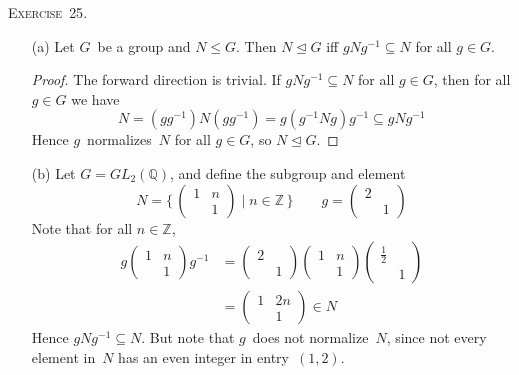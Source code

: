 \documentclass[letterpaper]{article}
\newcommand{\exercise}[1]{\goodbreak\noindent\textsc{Exercise~{#1}.}}
\newcommand{\Z}{\mathbb{Z}}
\newcommand{\Q}{\mathbb{Q}}
\newcommand{\subgroup}{\le}
\newcommand{\normal}{\trianglelefteq}
\begin{document}
\exercise{25}
\begin{enumerate}[itemsep=0pt]
\item[(a)] Let $G$~be a group and $N\subgroup G$. Then $N\normal G$ iff $gNg^{-1}\subseteq N$ for all $g\in G$.
\begin{proof}
The forward direction is trivial. If $gNg^{-1}\subseteq N$ for all $g\in G$, then for all $g\in G$ we have
$$N=(gg^{-1})N(gg^{-1})=g(g^{-1}Ng)g^{-1}\subseteq gNg^{-1}$$
Hence $g$~normalizes~$N$ for all $g\in G$, so $N\normal G$.
\end{proof}
\item[(b)] Let $G=GL_2(\Q)$, and define the subgroup and element
$$N=\biggl\{\,
\begin{pmatrix}
1&n\\
 &1
\end{pmatrix}
\mid n\in\Z\,\biggr\}\qquad g=\begin{pmatrix}2&\\&1\end{pmatrix}$$
Note that for all $n\in\Z$,
\begin{align*}
g\begin{pmatrix}1&n\\&1\end{pmatrix}g^{-1}
&=\begin{pmatrix}2&\\&1\end{pmatrix}\begin{pmatrix}1&n\\&1\end{pmatrix}\begin{pmatrix}\tfrac{1}{2}&\\&1\end{pmatrix}\\
&=\begin{pmatrix}1&2n\\&1\end{pmatrix}\in N
\end{align*}
Hence $gNg^{-1}\subseteq N$. But note that $g$~does not normalize~$N$, since not every element in~$N$ has an even integer in entry~$(1,2)$.
\end{enumerate}
\end{document}
